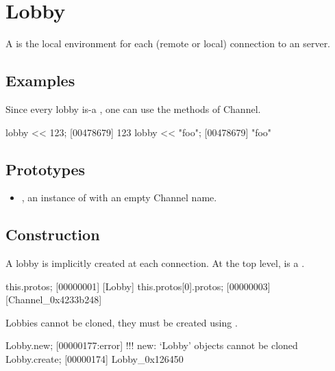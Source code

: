
\section{Lobby}

A  is the local environment for each (remote or local)
connection to an \urbi server.

\subsection{Examples}

Since every lobby is-a , one can use the methods of
Channel.

\begin{urbiscript}
lobby << 123;
[00478679] 123
lobby << "foo";
[00478679] "foo"
\end{urbiscript}

\subsection{Prototypes}
\begin{itemize}
\item {}, an instance of 
  with an empty Channel name.
\end{itemize}

\subsection{Construction}

A lobby is implicitly created at each connection. At the top level,
\this is a .

\begin{urbiscript}
this.protos;
[00000001] [Lobby]
this.protos[0].protos;
[00000003] [Channel_0x4233b248]
\end{urbiscript}

Lobbies cannot be cloned, they must be created using .

\begin{urbiscript}
Lobby.new;
[00000177:error] !!! new: `Lobby' objects cannot be cloned
Lobby.create;
[00000174] Lobby_0x126450
\end{urbiscript}


